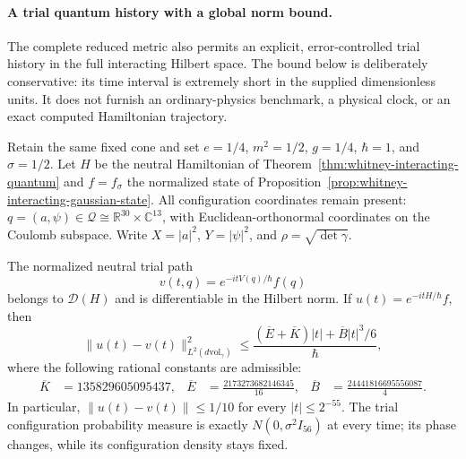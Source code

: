 \paragraph{A trial quantum history with a global norm bound.}
The complete reduced metric also permits an explicit, error-controlled
trial history in the full interacting Hilbert space. The bound below is
deliberately conservative: its time interval is extremely short in the
supplied dimensionless units. It does not furnish an ordinary-physics
benchmark, a physical clock, or an exact computed Hamiltonian trajectory.

Retain the same fixed cone and set
\(e=1/4\), \(m^2=1/2\), \(g=1/4\), \(\hbar=1\), and
\(\sigma=1/2\). Let \(H\) be the neutral Hamiltonian of
Theorem~\ref{thm:whitney-interacting-quantum} and \(f=f_\sigma\) the
normalized state of Proposition~\ref{prop:whitney-interacting-gaussian-state}.
All configuration coordinates remain present:
\(q=(a,\psi)\in\mathcal Q\cong\mathbb R^{30}\times\mathbb C^{13}\),
with Euclidean-orthonormal coordinates on the Coulomb subspace. Write
\(X=|a|^2\), \(Y=|\psi|^2\), and \(\rho=\sqrt{\det\gamma}\).

\begin{theorem}
\label{thm:whitney-quantum-trial-history}
The normalized neutral trial path
\[
 v(t,q)=e^{-itV(q)/\hbar}f(q)
\]
belongs to \(\mathcal D(H)\) and is differentiable in the Hilbert norm.
If \(u(t)=e^{-itH/\hbar}f\), then
\begin{equation}
 \|u(t)-v(t)\|_{L^2(d\mathrm{vol}_\gamma)}^2
 \leq\frac{(\overline E+\overline K)|t|
                   +\overline B|t|^3/6}{\hbar},
 \label{eq:whitney-quantum-trial-error}
\end{equation}
where the following rational constants are admissible:
\begin{align*}
 \overline K&=135829605095437,&
 \overline E&=\frac{2173273682146345}{16},&
 \overline B&=\frac{24441816695556087}{4}.
\end{align*}
In particular, \(\|u(t)-v(t)\|\leq1/10\) for every
\(|t|\leq2^{-55}\). The trial configuration probability measure is
exactly \(N(0,\sigma^2I_{56})\) at every time; its phase changes, while
its configuration density stays fixed.
\end{theorem}

